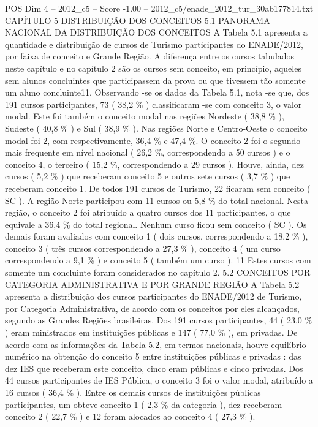 \begin{textsample}{POS Dim 4 – 2012\_c5 – Score -1.00 – 2012\_c5/enade\_2012\_tur\_30ab177814.txt}  \label{ex:f4_pos_250}
CAPÍTULO 5 DISTRIBUIÇÃO DOS CONCEITOS 5.1 PANORAMA NACIONAL DA DISTRIBUIÇÃO DOS CONCEITOS A Tabela 5.1 apresenta a quantidade e distribuição de cursos de Turismo participantes do ENADE/2012, por faixa de conceito e Grande Região.
A diferença entre os cursos tabulados neste capítulo e no capítulo 2 são os cursos sem conceito, em princípio, aqueles sem alunos concluintes que participassem da prova ou que tivessem tão somente um aluno concluinte11.
Observando -se os dados da Tabela 5.1, nota -se que, dos 191 cursos participantes, 73 ( 38,2 \% ) classificaram -se com conceito 3, o valor modal.
Este foi também o conceito modal nas regiões Nordeste ( 38,8 \% ), Sudeste ( 40,8 \% ) e Sul ( 38,9 \% ).
Nas regiões Norte e Centro-Oeste o conceito modal foi 2, com respectivamente, 36,4 \% e 47,4 \%.
O conceito 2 foi o segundo mais frequente em nível nacional ( 26,2 \%, correspondendo a 50 cursos ) e o conceito 4, o terceiro ( 15,2 \%, correspondendo a 29 cursos ).
Houve, ainda, dez cursos ( 5,2 \% ) que receberam conceito 5 e outros sete cursos ( 3,7 \% ) que receberam conceito 1.
De todos 191 cursos de Turismo, 22 ficaram sem conceito ( SC ).
A região Norte participou com 11 cursos ou 5,8 \% do total nacional.
Nesta região, o conceito 2 foi atribuído a quatro cursos dos 11 participantes, o que equivale a 36,4 \% do total regional.
Nenhum curso ficou sem conceito ( SC ).
Os demais foram avaliados com conceito 1 ( dois cursos, correspondendo a 18,2 \% ), conceito 3 ( três cursos correspondendo a 27,3 \% ), conceito 4 ( um curso correspondendo a 9,1 \% ) e conceito 5 ( também um curso ). 11 Estes cursos com somente um concluinte foram considerados no capítulo 2. 5.2 CONCEITOS POR CATEGORIA ADMINISTRATIVA E POR GRANDE REGIÃO A Tabela 5.2 apresenta a distribuição dos cursos participantes do ENADE/2012 de Turismo, por Categoria Administrativa, de acordo com os conceitos por eles alcançados, segundo as Grandes Regiões brasileiras.
Dos 191 cursos participantes, 44 ( 23,0 \% ) eram ministrados em instituições públicas e 147 ( 77,0 \% ), em privadas.
De acordo com as informações da Tabela 5.2, em termos nacionais, houve equilíbrio numérico na obtenção do conceito 5 entre instituições públicas e privadas : das dez IES que receberam este conceito, cinco eram públicas e cinco privadas.
Dos 44 cursos participantes de IES Pública, o conceito 3 foi o valor modal, atribuído a 16 cursos ( 36,4 \% ).
Entre os demais cursos de instituições públicas participantes, um obteve conceito 1 ( 2,3 \% da categoria ), dez receberam conceito 2 ( 22,7 \% ) e 12 foram alocados ao conceito 4 ( 27,3 \% ).

\end{textsample}
